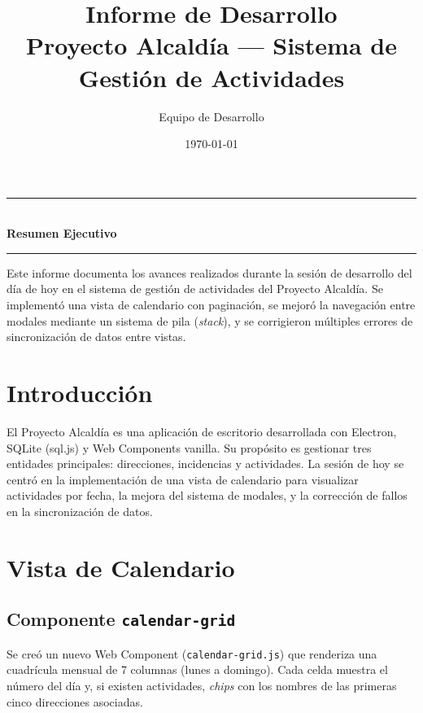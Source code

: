 \documentclass[12pt,a4paper]{article}
\title{\textbf{Informe de Desarrollo}\\[4pt]
       \large Proyecto Alcaldía — Sistema de Gestión de Actividades}
\author{Equipo de Desarrollo}
\date{\today}
\begin{document}
\maketitle
\thispagestyle{empty}

\begin{center}
\rule{0.5\textwidth}{0.4pt}\\[4pt]
\textbf{Resumen Ejecutivo}\\[4pt]
\rule{0.5\textwidth}{0.4pt}
\end{center}

Este informe documenta los avances realizados durante la sesión de desarrollo del día de hoy en el sistema de gestión de actividades del Proyecto Alcaldía. Se implementó una vista de calendario con paginación, se mejoró la navegación entre modales mediante un sistema de pila (\textit{stack}), y se corrigieron múltiples errores de sincronización de datos entre vistas.

\tableofcontents
\newpage

\section{Introducción}

El Proyecto Alcaldía es una aplicación de escritorio desarrollada con Electron, SQLite (sql.js) y Web Components vanilla. Su propósito es gestionar tres entidades principales: direcciones, incidencias y actividades. La sesión de hoy se centró en la implementación de una vista de calendario para visualizar actividades por fecha, la mejora del sistema de modales, y la corrección de fallos en la sincronización de datos.

\section{Vista de Calendario}

\subsection{Componente \texttt{calendar-grid}}

Se creó un nuevo Web Component (\texttt{calendar-grid.js}) que renderiza una cuadrícula mensual de 7 columnas (lunes a domingo). Cada celda muestra el número del día y, si existen actividades, \textit{chips} con los nombres de las primeras cinco direcciones asociadas.
\end{document}

